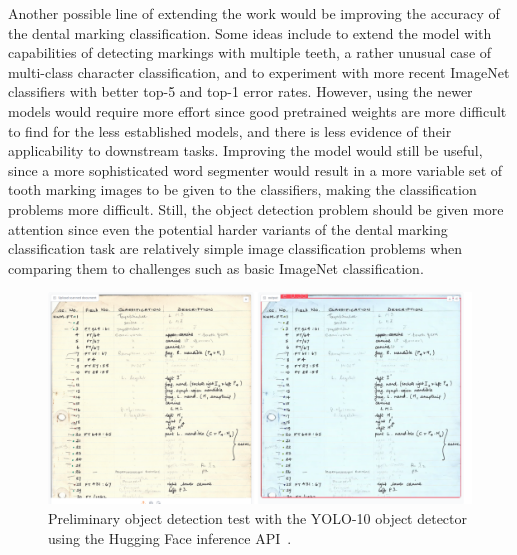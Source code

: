 \documentclass[english,twoside,openright]{UH_DS_MSc}
\begin{document}
Another possible line of extending the work would be improving the accuracy of the dental marking classification. 
Some ideas include to extend the model with capabilities of detecting markings with multiple teeth,
a rather unusual case of multi-class character classification, and to experiment with more recent ImageNet classifiers with better top-5 and top-1 error rates.
However, using the newer models would require more effort since good pretrained weights are 
more difficult to find for the less established models, and there is less evidence of their applicability to downstream tasks. Improving the model would still be useful, since a more sophisticated word segmenter would result in a more 
variable set of tooth marking images to be given to the classifiers, making the classification problems more difficult. 
Still, the object detection problem should be given more attention since even the 
potential harder variants of the dental marking classification task are relatively simple image classification problems when comparing 
them to challenges such as basic ImageNet classification.

\begin{figure}[ht]
    \centering
    \includegraphics*[scale=0.29]{images/yoloresult.png}
    \caption{Preliminary object detection test with the YOLO-10 object detector using the Hugging Face inference API~\cite{OmouredYOLOv10DocumentLayoutAnalysisHugging2023}.}
    \label{image:yolo}
\end{figure}
\end{document}
